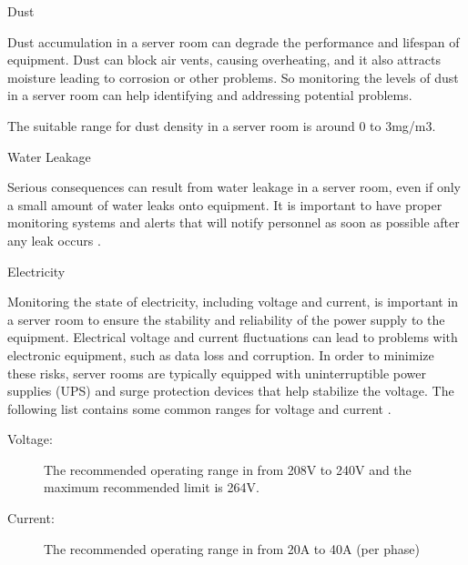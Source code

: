 \begin{itemize}
        \item Dust
            \begin{description}
                \item Dust accumulation in a server room can degrade the performance and lifespan of equipment. Dust can block air vents, causing overheating, and it also attracts moisture leading to corrosion or other problems. So monitoring the levels of dust in a server room can help identifying and addressing potential problems.
                    \begin{description}
                        \item The suitable range for dust density in a server room is around 0 to 3mg/m3.
                    \end{description}
            \end{description}
        \item Water Leakage
            \begin{description}
                \item Serious consequences can result from water leakage in a server room, even if only a small amount of water leaks onto equipment. It is important to have proper monitoring systems and alerts that will notify personnel as soon as possible after any leak occurs \cite{telecommunications2010tia}.
            \end{description}
        \item Electricity
            \begin{description}
                \item Monitoring the state of electricity, including voltage and current, is important in a server room to ensure the stability and reliability of the power supply to the equipment. Electrical voltage and current fluctuations can lead to problems with electronic equipment, such as data loss and corruption. In order to minimize these risks, server rooms are typically equipped with uninterruptible power supplies (UPS) and surge protection devices that help stabilize the voltage. The following list contains some common ranges for voltage and current \cite{telecommunications2010tia}.
                \begin{description}
                    \item[Voltage:] The recommended operating range in from 208V to 240V and the maximum recommended limit is 264V.
                    \item[Current:] The recommended operating range in from 20A to 40A (per phase)

\end{description}
\end{description}
\end{itemize}
